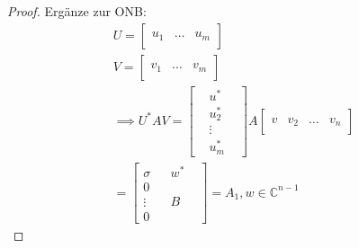 \documentclass{book}
\def\C{\mathbb{C}}
\begin{document}
\begin{proof}
                Ergänze zur ONB:
                \begin{align*}
                    U=\begin{bmatrix}
                        &&\\
                        u_1 & \dots & u_m\\
                        &&
                    \end{bmatrix}\\
                    V=\begin{bmatrix}
                        &&\\
                        v_1 & \dots & v_m\\
                        &&
                    \end{bmatrix}\\
                    \implies U^* A V = \begin{bmatrix}
                        &u^*&\\
                        &u_2^*& \\
                        &\vdots& \\
                        &u_m^*&
                    \end{bmatrix}A\begin{bmatrix}
                        &&\\
                        v & v_2 & \dots & v_n\\
                        &&
                    \end{bmatrix}\\
                    =\begin{bmatrix}
                        \sigma & & w^* & \\
                        0 & & &\\
                        \vdots & & B &\\
                        0 & & & 
                    \end{bmatrix}=A_1,w\in \C^{n-1}
                \end{align*}


\end{proof}
\end{document}

